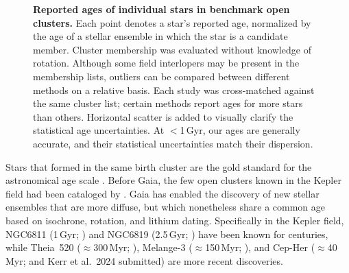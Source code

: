 \documentclass[11pt,twocolumn,tighten,linenumbers,trackchanges]{aastex63}
\begin{document}
\begin{figure}[!t]
	\begin{center}
	\end{center}
	\vspace{-0.5cm}
	\caption{
		{\bf Reported ages of individual stars in benchmark open clusters.}
    Each point denotes a star's reported age, normalized by the age of
    a stellar ensemble in which the star is a candidate member.
    Cluster membership was evaluated without knowledge of rotation.
    Although some field interlopers may be present in the membership
    lists, outliers can be compared between different methods on a
    relative basis.  Each study was cross-matched against the same
    cluster list; certain methods report ages for more stars than
    others.  Horizontal scatter is added to visually clarify the
    statistical age uncertainties.  At $<$1\,Gyr, our ages are
    generally accurate, and their statistical uncertainties match
    their dispersion.
	}
	\label{fig:agescalecompone}
\end{figure}

Stars that formed in the same birth cluster are the gold standard for
the astronomical age scale \citep{Soderblom_2010}.  Before Gaia, the
few open clusters known in the Kepler field had been cataloged by
\citet{1864RSPT..154....1H}.  Gaia has enabled the discovery of
new stellar ensembles that are more diffuse, but which nonetheless share a
common age based on isochrone, rotation, and lithium dating.
Specifically in the Kepler field,
NGC6811 (1\,Gyr; \citealt{Curtis_2019_ngc6811}) and NGC6819 (2.5\,Gyr; \citealt{Meibom_2015}) 
have been known for centuries,
while 
Theia~520 ($\approx$300\,Myr; \citealt{2019AJ....158..122K}), Melange-3 ($\approx$150\,Myr; \citealt{Barber_2022}), and Cep-Her ($\approx$40\,Myr; \citealt{Bouma_2022b} and Kerr et al.~2024 submitted) are more recent discoveries.
\end{document}
